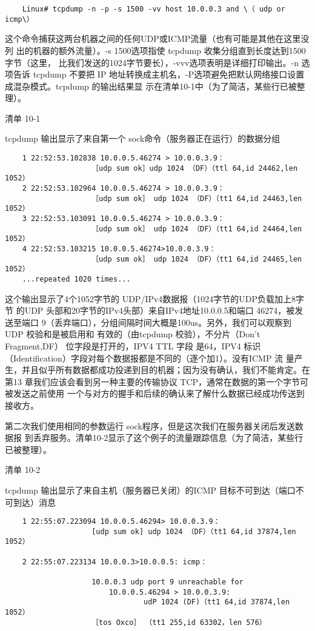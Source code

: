 \begin{verbatim}
    Linux# tcpdump -n -p -s 1500 -vv host 10.0.0.3 and \（ udp or icmp\）
\end{verbatim}

这个命令捕获这两台机器之间的任何UDP或ICMP流量（也有可能是其他在这里没列
出的机器的额外流量）。-s 1500选项指使 tcpdump 收集分组直到长度达到1500字节（这里，
比我们发送的1024字节要长），-vvv选项表明是详细打印输出。-n 选项告诉 tcpdump 不要把
IP 地址转换成主机名，-P选项避免把默认网络接口设置成混杂模式。tcpdump 的输出结果显
示在清单10-1中（为了简洁，某些行已被整理）。

清单 10-1

tcpdump 输出显示了来自第一个 sock命令（服务器正在运行）的数据分组
\begin{verbatim}
    1 22:52:53.102838 10.0.0.5.46274 > 10.0.0.3.9：
                    ［udp sum ok］udp 1024 （DF）（ttl 64,id 24462,len 1052）
    2 22:52:53.102964 10.0.0.5.46274 > 10.0.0.3.9：
                    ［udp sum ok］ udp 1024 （DF）（tt1 64,id 24463,len 1052）
    3 22:52:53.103091 10.0.0.5.46274 > 10.0.0.3.9：
                    ［udp sum ok］ udp 1024 （DF）（tt1 64,id 24464,len 1052）
    4 22:52:53.103215 10.0.0.5.46274>10.0.0.3.9：
                    ［udp sum ok］ udp 1024 （DF）（tt1 64,id 24465,len 1052）
    ...repeated 1020 times...
\end{verbatim}

这个输出显示了4个1052字节的 UDP/IPv4数据报（1024字节的UDP负载加上8字节
的UDP 头部和20字节的IPv4头部）来自IPv4地址10.0.0.5和端口 46274，被发送至端口
9（丢弃端口），分组间隔时间大概是100us。另外，我们可以观察到 UDP 校验和是被启用和
有效的（由tcpdump 校验），不分片（Don't Fragment,DF） 位字段是打开的，IPV4 TTL 字段
是64，IPV4 标识（Identification）字段对每个数据报都是不同的（逐个加1）。没有ICMP 流
量产生，并且似乎所有数据都成功投递到目的机器；因为没有确认，我们不能肯定。在第13
章我们应该会看到另一种主要的传输协议 TCP，通常在数据的第一个字节可被发送之前使用
一个与对方的握手和后续的确认来了解什么数据已经成功传送到接收方。

第二次我们使用相同的参数运行 sock程序，但是这次我们在服务器关闭后发送数据报
到丢弃服务。清单10-2显示了这个例子的流量跟踪信息（为了简洁，某些行已被整理）。

清单 10-2

tcpdump 输出显示了来自主机（服务器已关闭）的ICMP 目标不可到达（端口不可到达）消息

\begin{verbatim}
    1 22:55:07.223094 10.0.0.5.46294> 10.0.0.3.9：
                    [udp sum ok] udp 1024 （DF）（tt1 64,id 37874,len 1052）
    
    2 22:55:07.223134 10.0.0.3>10.0.0.5: icmp：
    
                    10.0.0.3 udp port 9 unreachable for
                        1O.0.0.5.46294 > 10.0.0.3.9:
                                udP 1024 (DF)（tt1 64,id 37874,len 1052）
                    ［tos Oxco］ （tt1 255,id 63302，len 576）
\end{verbatim}

